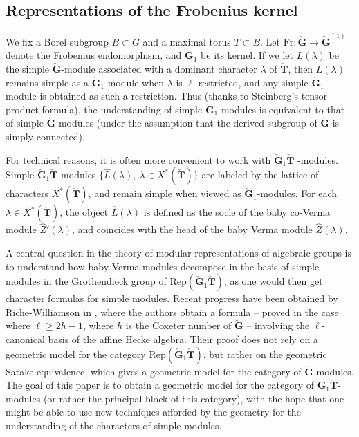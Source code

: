 \documentclass[11pt]{amsart}
\theoremstyle{plain}
\theoremstyle{remark}
\numberwithin{equation}{section}
\begin{document}
\subsection{Representations of the Frobenius kernel}
We fix a Borel subgroup $B\subset G$ and a maximal torus $T\subset B$. Let $\mathrm{Fr}:\check{\mathbf{G}}\to \check{\mathbf{G}}^{(1)}$ denote the Frobenius endomorphism, and $\check{\mathbf{G}}_1$ be its kernel. If we let $L(\lambda)$ be the simple $\check{\mathbf{G}}$-module
associated with a dominant character $\lambda$ of $\check{\mathbf{T}}$, then $L(\lambda)$ remains simple as a $\check{\mathbf{G}}_1$-module when $\lambda$
is $\ell$-restricted, and any simple $\check{\mathbf{G}}_1$-module is obtained as such a restriction. Thus (thanks to Steinberg's tensor product formula), the understanding of simple $\check{\mathbf{G}}_1$-modules is equivalent to that of simple $\check{\mathbf{G}}$-modules (under the assumption that the derived subgroup of $\check{\mathbf{G}}$ is simply connected).

For technical reasons, it is often more convenient to work with $\check{\mathbf{G}}_1\check{\mathbf{T}}$ -modules. Simple $\check{\mathbf{G}}_1\check{\mathbf{T}}$-modules
$\{\widehat{L}(\lambda),~\lambda\in X^*(\check{\mathbf{T}})\}$ are labeled by the lattice of characters $X^*(\check{\mathbf{T}})$, and remain simple when viewed as $\check{\mathbf{G}}_1$-modules. For each $\lambda\in X^*(\check{\mathbf{T}})$, the object $\widehat{L}(\lambda)$ is defined as the socle of the baby co-Verma module $\widehat{Z}'(\lambda)$, and coincides with the head of the baby Verma module $\widehat{Z}(\lambda)$.

A central question in the theory of modular representations of algebraic groups is to understand how baby Verma modules decompose in the basis of simple modules in the Grothendieck group of $\mathrm{Rep}(\check{\mathbf{G}}_1\check{\mathbf{T}})$, as one would then get character formulas for simple modules. Recent progress have been obtained by Riche-Williamson in \cite{riche2021simple}, where the authors obtain a formula -- proved in the case where $\ell\geq 2h-1$, where $h$ is the Coxeter number of $\check{\mathbf{G}}$ -- involving the $\ell$-canonical basis of the affine Hecke algebra. Their proof does not rely on a geometric model for the category $\mathrm{Rep}(\check{\mathbf{G}}_1\check{\mathbf{T}})$, but rather on the geometric Satake equivalence, which gives a geometric model for the category of $\check{\mathbf{G}}$-modules. The goal of this paper is to obtain a geometric model for the category of $\check{\mathbf{G}}_1\check{\mathbf{T}}$-modules (or rather the principal block of this category), with the hope that one might be able to use new techniques afforded by the geometry for the understanding of the characters of simple modules.
\end{document}
